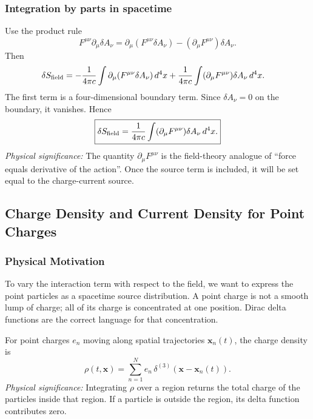 \subsubsection*{Integration by parts in spacetime}

Use the product rule
\begin{equation}\label{eq:lec09-product-rule}
  F^{\mu\nu}\partial_\mu\delta A_\nu
  =
  \partial_\mu\!\left(F^{\mu\nu}\delta A_\nu\right)
  -(\partial_\mu F^{\mu\nu})\delta A_\nu .
\end{equation}
Then
\begin{align}
  \delta S_{\rm field}
  &=
  -\frac{1}{4\pi c}\int
  \partial_\mu\!\left(F^{\mu\nu}\delta A_\nu\right)d^4x
  +
  \frac{1}{4\pi c}\int
  (\partial_\mu F^{\mu\nu})\delta A_\nu\,d^4x .
  \label{eq:lec09-dSf-parts}
\end{align}
The first term is a four-dimensional boundary term.  Since
$\delta A_\nu=0$ on the boundary, it vanishes.  Hence
\begin{equation}\label{eq:lec09-dSf-final}
  \boxed{
  \delta S_{\rm field}
  =
  \frac{1}{4\pi c}\int
  (\partial_\mu F^{\mu\nu})\delta A_\nu\,d^4x .
  }
\end{equation}
\textit{Physical significance:} The quantity $\partial_\mu F^{\mu\nu}$ is the
field-theory analogue of ``force equals derivative of the action''.  Once the
source term is included, it will be set equal to the charge-current source.

\subsection{Charge Density and Current Density for Point Charges}\label{subsec:lec09-rho-J}

\subsubsection*{Physical Motivation}
To vary the interaction term with respect to the field, we want to express the
point particles as a spacetime source distribution.  A point charge is not a
smooth lump of charge; all of its charge is concentrated at one position.
Dirac delta functions are the correct language for that concentration.

For point charges $e_n$ moving along spatial trajectories $\mathbf{x}_n(t)$, the
charge density is
\begin{equation}\label{eq:lec09-rho-def}
  \boxed{
  \rho(t,\mathbf{x})
  =
  \sum_{n=1}^N e_n\,
  \delta^{(3)}\!\left(\mathbf{x}-\mathbf{x}_n(t)\right).
  }
\end{equation}
\textit{Physical significance:} Integrating $\rho$ over a region returns the
total charge of the particles inside that region.  If a particle is outside the
region, its delta function contributes zero.

